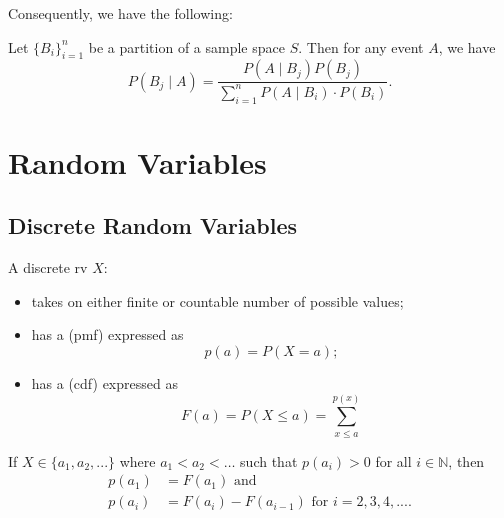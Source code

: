 \documentclass[notoc,notitlepage]{tufte-book}
\begin{document}
Consequently, we have the following:

\begin{crly}
\label{crly:bayes_formula}
  Let $\{ B_i \}_{i = 1}^{n}$ be a partition of a sample space $S$. Then for any
  event $A$, we have
  \begin{equation*}
    P(B_j \mid A) = \frac{P(A \mid B_j) P(B_j)}{\sum_{i=1}^{n} P(A \mid B_i) \cdot P(B_i)}.
  \end{equation*}
\end{crly}


\section{Random Variables}%
\label{sec:random_variables}

\subsection{Discrete Random Variables}%
\label{sub:discrete_random_variables}


A discrete rv $X$:
\begin{itemize}
  \item takes on either finite or countable number of possible values;
  \item has a  (pmf) expressed as
    \begin{equation*}
      p(a) = P(X = a);
    \end{equation*}
  \item has a  (cdf) expressed as
    \begin{equation*}
      F(a) = P(X \leq a) = \sum_{x \leq a}^{p(x)} 
    \end{equation*}
\end{itemize}

\begin{note}
  If $X \in \{a_1, a_2, ...\}$ where $a_1 < a_2 < \hdots$ such that $p(a_i) > 0$ for all $i \in \mathbb{N}$, then
  \begin{align*}
    p(a_1) &= F(a_1) \text{ and } \\
    p(a_i) &= F(a_i) - F(a_{i - 1}) \text{ for } i = 2, 3, 4, ....
  \end{align*}
\end{note}
\end{document}
